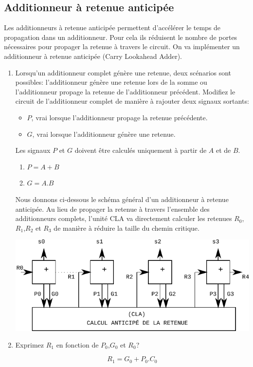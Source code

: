\documentclass[a4paper,10pt]{exam}
\begin{document}
\subsection{Additionneur à retenue anticipée}
Les additionneurs à retenue anticipée permettent d'accélérer le temps de
propagation dans un additionneur. Pour cela ils réduisent le nombre de portes
nécessaires pour propager la retenue à travers le circuit.  On va implémenter un
additionneur à retenue anticipée (Carry Lookahead Adder).

\begin{enumerate}
\item Lorsqu'un additionneur complet génère une retenue, deux scénarios sont
  possibles: l'additionneur génère une retenue lors de la somme ou
  l'additionneur propage la retenue de l'additionneur précédent.  Modifiez le
  circuit de l'additionneur complet de manière à rajouter deux signaux sortants:
  \begin{itemize}
    \item $P$, vrai lorsque l'additionneur propage la retenue précédente.
    \item $G$, vrai lorsque l'additionneur génère une retenue.
  \end{itemize}
  Les signaux $P$ et $G$ doivent être calculés uniquement à partir de $A$ et de
  $B$.
\begin{solution}
  \begin{enumerate}
  \item $P = A + B$
  \item $G = A.B$
  \end{enumerate}
\end{solution}

Nous donnons ci-dessous le schéma général d'un additionneur
à retenue anticipée. Au lieu de propager la retenue à travers
l'ensemble des additionneurs complets, l'unité CLA va directement
calculer les retenues $R_0$,$R_1$,$R_2$ et $R_3$ de manière à réduire
la taille du chemin critique.

\includegraphics{TD10-CLA1}
\item Exprimez $R_1$ en fonction de $P_0$,$G_0$ et $R_0$?
\begin{solution}
  $$ R_1 = G_0 + P_0.C_0 $$
\end{solution}


\end{enumerate}
\end{document}
